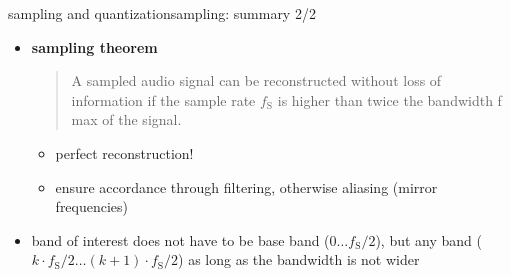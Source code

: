 		\begin{frame}{sampling and quantization}{sampling: summary 2/2}
			\begin{itemize}
				\item   \textbf{sampling theorem}
                    \begin{quote}
                        A sampled audio signal can be reconstructed without loss of information if the sample rate $f_\mathrm{S}$ is higher than twice the bandwidth f max of the signal.
                    \end{quote}
                    \smallskip
                    \begin{itemize}
                        \item<2->   perfect reconstruction!
                        \item<2->   ensure accordance through filtering, otherwise aliasing (mirror frequencies)
                    \end{itemize}
                \bigskip
                \item<3->   band of interest does not have to be base band ($0\ldots f_\mathrm{S}/2$), but any band ($k\cdot f_\mathrm{S}/2\ldots(k+1)\cdot f_\mathrm{S}/2$) as long as the bandwidth is not wider 
			\end{itemize}
		\end{frame}



